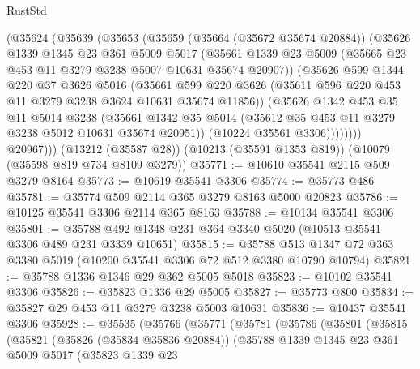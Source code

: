 \begin{lexlean}{RustStd}
\begin{coremodule}
          (@35624
            (@35639
              (@35653
                (@35659
                  (@35664 (@35672 @35674 @20884))
                  (@35626
                    @1339
                    @1345
                    @23
                    @361
                    @5009
                    @5017
                    (@35661
                      @1339
                      @23
                      @5009
                      (@35665 @23 @453 @11 @3279 @3238 @5007 @10631 @35674 @20907))
                    (@35626
                      @599
                      @1344
                      @220
                      @37
                      @3626
                      @5016
                      (@35661
                        @599
                        @220
                        @3626
                        (@35611 @596 @220 @453 @11 @3279 @3238 @3624 @10631 @35674 @11856))
                      (@35626
                        @1342
                        @453
                        @35
                        @11
                        @5014
                        @3238
                        (@35661
                          @1342
                          @35
                          @5014
                          (@35612 @35 @453 @11 @3279 @3238 @5012 @10631 @35674 @20951))
                        (@10224 @35561 @3306))))))))
          @20967)))
    (@13212 (@35587 @28))
    (@10213 (@35591 @1353 @819))
    (@10079 (@35598 @819 @734 @8109 @3279))
@35771 := @10610 @35541 @2115 @509 @3279 @8164
@35773 := @10619 @35541 @3306
@35774 := @35773 @486
@35781 := @35774 @509 @2114 @365 @3279 @8163 @5000 @20823
@35786 := @10125 @35541 @3306 @2114 @365 @8163
@35788 := @10134 @35541 @3306
@35801 := @35788 @492 @1348 @231 @364 @3340 @5020 (@10513 @35541 @3306 @489 @231 @3339 @10651)
@35815 := @35788 @513 @1347 @72 @363 @3380 @5019 (@10200 @35541 @3306 @72 @512 @3380 @10790 @10794)
@35821 := @35788 @1336 @1346 @29 @362 @5005 @5018
@35823 := @10102 @35541 @3306
@35826 := @35823 @1336 @29 @5005
@35827 := @35773 @800
@35834 := @35827 @29 @453 @11 @3279 @3238 @5003 @10631
@35836 := @10437 @35541 @3306
@35928 := @35535
    (@35766
      (@35771
        (@35781
          (@35786
            (@35801
              (@35815
                (@35821
                  (@35826 (@35834 @35836 @20884))
                  (@35788
                    @1339
                    @1345
                    @23
                    @361
                    @5009
                    @5017
                    (@35823
                      @1339
                      @23

\end{coremodule}
\end{lexlean}
